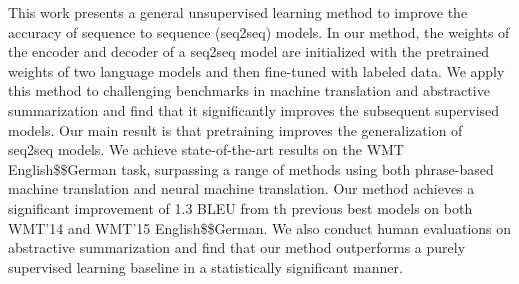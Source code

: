 This work presents a general unsupervised learning method to improve the accuracy of sequence to sequence (seq2seq) models. In our method, the weights of the encoder and decoder of a seq2seq model are initialized with the pretrained weights of two language models and then fine-tuned with labeled data. We apply this method to challenging benchmarks in machine translation and abstractive summarization and find that it significantly improves the subsequent supervised models.  Our main result is that pretraining improves the generalization of seq2seq models. We achieve state-of-the-art results on the WMT English\$\rightarrow\$German task, surpassing a range of methods using both phrase-based machine translation and neural machine translation. Our method achieves a significant improvement of 1.3 BLEU from th previous best models on both WMT'14 and WMT'15 English\$\rightarrow\$German. We also conduct human evaluations on abstractive summarization and find that our method outperforms a purely supervised learning baseline in a statistically significant manner.
